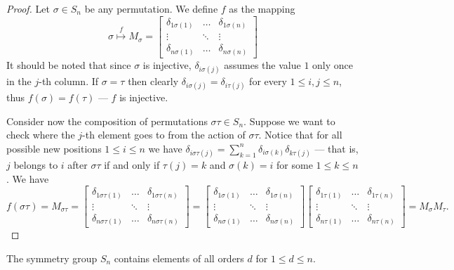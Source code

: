 \begin{proof}
Let \(\sigma \in S_n\) be any permutation. We define \(f\) as the
mapping
\[
  \sigma \overset f \longmapsto M_\sigma =
  \begin{bmatrix}
    \delta_{1 \sigma(1)} &\dots &\delta_{1 \sigma(n)} \\
    \vdots &\ddots &\vdots \\
    \delta_{n \sigma(1)} &\dots &\delta_{n \sigma(n)}
  \end{bmatrix}
\]
It should be noted that since \(\sigma\) is injective, \(\delta_{i
\sigma(j)}\) assumes the value \(1\) only once in the \(j\)-th column. If
\(\sigma = \tau\) then clearly \(\delta_{i \sigma(j)} = \delta_{i \tau(j)}\)
for every \(1 \leq i, j \leq n\), thus \(f(\sigma) = f(\tau)\) --- \(f\) is
injective.

Consider now the composition of permutations \(\sigma \tau \in S_n\).
Suppose we want to check where the \(j\)-th element goes to from the action of
\(\sigma \tau\). Notice that for all possible new positions \(1 \leq i \leq
n\) we have \(\delta_{i \sigma\tau(j)} = \sum_{k = 1}^n \delta_{i \sigma(k)}
\delta_{k \tau(j)}\) --- that is, \(j\) belongs to \(i\) after \(\sigma \tau\)
if and only if \(\tau(j) = k\) and \(\sigma(k) = i\) for some \(1 \leq k \leq
n\). We have
\[
  f(\sigma \tau) = M_{\sigma \tau} =
  \begin{bmatrix}
    \delta_{1 \sigma\tau(1)} &\dots &\delta_{1 \sigma\tau(n)} \\
    \vdots &\ddots &\vdots \\
    \delta_{n \sigma\tau(1)} &\dots &\delta_{n \sigma\tau(n)}
  \end{bmatrix}
  =
  \begin{bmatrix}
    \delta_{1 \sigma(1)} &\dots &\delta_{1 \sigma(n)} \\
    \vdots &\ddots &\vdots \\
    \delta_{n \sigma(1)} &\dots &\delta_{n \sigma(n)}
  \end{bmatrix}
  \begin{bmatrix}
    \delta_{1 \tau(1)} &\dots &\delta_{1 \tau(n)} \\
    \vdots &\ddots &\vdots \\
    \delta_{n \tau(1)} &\dots &\delta_{n \tau(n)}
  \end{bmatrix}
  = M_\sigma M_\tau.
\]
\end{proof}

\begin{proposition}\label{prop: sym-n-all-orders}
The symmetry group \(S_n\) contains elements of all orders \(d\) for
\(1 \leq d \leq n\).
\end{proposition}

